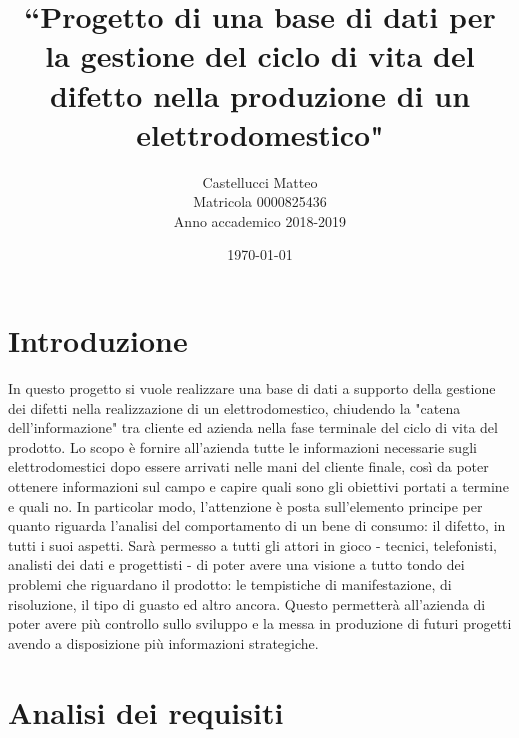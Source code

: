 \documentclass[a4paper, 12pt]{report}
\title{``Progetto di una base di dati per la gestione del ciclo di vita del difetto nella produzione di un elettrodomestico"}
\author{Castellucci Matteo\\Matricola 0000825436\\Anno accademico 2018-2019}
\date{\today}
\begin{document}
\maketitle

\tableofcontents

\chapter{Introduzione}
In questo progetto si vuole realizzare una base di dati a supporto della gestione dei difetti nella realizzazione di un elettrodomestico,
chiudendo la "catena dell'informazione" tra cliente ed azienda nella fase terminale del ciclo di vita del prodotto. Lo scopo è fornire
all'azienda tutte le informazioni necessarie sugli elettrodomestici dopo essere arrivati nelle mani del cliente finale, così da poter
ottenere informazioni sul campo e capire quali sono gli obiettivi portati a termine e quali no. In particolar modo, l'attenzione è posta sull'elemento
principe per quanto riguarda l'analisi del comportamento di un bene di consumo: il difetto, in tutti i suoi aspetti. Sarà permesso a tutti gli
attori in gioco - tecnici, telefonisti, analisti dei dati e progettisti - di poter avere una visione a tutto tondo dei problemi che riguardano
il prodotto: le tempistiche di manifestazione, di risoluzione, il tipo di guasto ed altro ancora. Questo permetterà all'azienda di poter
avere più controllo sullo sviluppo e la messa in produzione di futuri progetti avendo a disposizione più informazioni strategiche.

\chapter{Analisi dei requisiti}
\end{document}
